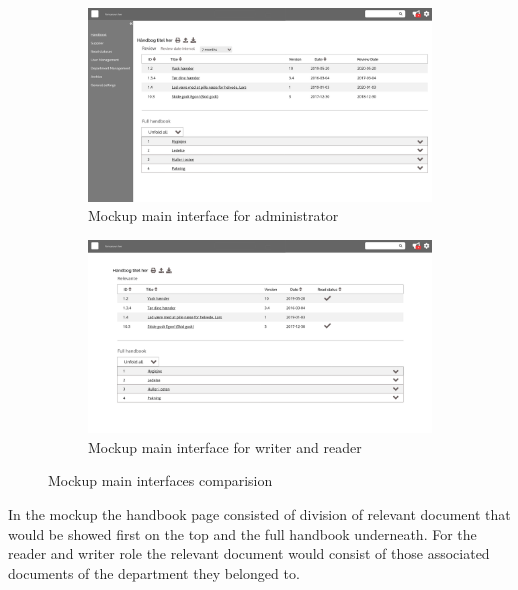 \begin{figure}[H]
	\centering
	\begin{subfigure}[b]{0.48\textwidth}
		\includegraphics[width=\textwidth]{billeder/ForsideAdmin.jpg}
		\caption{Mockup main interface for administrator}
	\end{subfigure}
	\quad
	\begin{subfigure}[b]{0.48\textwidth}
		\includegraphics[width=\textwidth]{billeder/ForsideWriterReader.jpg}
		\caption{Mockup main interface for writer and reader}
	\end{subfigure}
	\caption{Mockup main interfaces comparision}\label{fig:mockupSidebar}
\end{figure}

In the mockup the handbook page consisted of division of relevant document that would be showed first on the top and the full handbook underneath.
For the reader and writer role the relevant document would consist of those associated documents of the department they belonged to.


